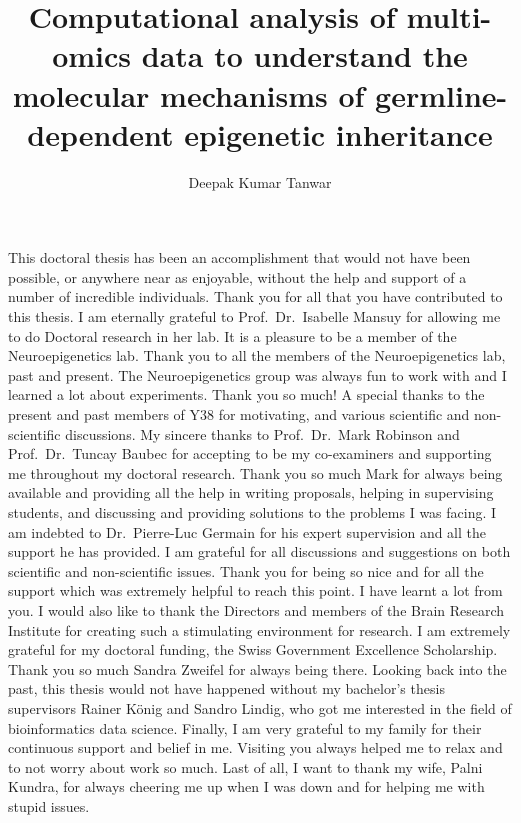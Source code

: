 \documentclass[12pt,twoside]{reedthesis}
\title{Computational analysis of multi-omics data to understand the molecular mechanisms of germline-dependent epigenetic inheritance}
\author{Deepak Kumar Tanwar}
\date{}
\begin{document}
  \maketitle

\frontmatter %
\pagestyle{empty} %
  \begin{acknowledgements}
    This doctoral thesis has been an accomplishment that would not have been possible, or anywhere near as enjoyable, without the help and support of a number of incredible individuals. Thank you for all that you have contributed to this thesis. \newline\newline I am eternally grateful to Prof.~Dr.~Isabelle Mansuy for allowing me to do Doctoral research in her lab. It is a pleasure to be a member of the Neuroepigenetics lab. Thank you to all the members of the Neuroepigenetics lab, past and present. The Neuroepigenetics group was always fun to work with and I learned a lot about experiments. Thank you so much! A special thanks to the present and past members of Y38 for motivating, and various scientific and non-scientific discussions. \newline\newline My sincere thanks to Prof.~Dr.~Mark Robinson and Prof.~Dr.~Tuncay Baubec for accepting to be my co-examiners and supporting me throughout my doctoral research. Thank you so much Mark for always being available and providing all the help in writing proposals, helping in supervising students, and discussing and providing solutions to the problems I was facing. \newline\newline I am indebted to Dr.~Pierre-Luc Germain for his expert supervision and all the support he has provided. I am grateful for all discussions and suggestions on both scientific and non-scientific issues. Thank you for being so nice and for all the support which was extremely helpful to reach this point. I have learnt a lot from you. \newline\newline I would also like to thank the Directors and members of the Brain Research Institute for creating such a stimulating environment for research. \newline\newline I am extremely grateful for my doctoral funding, the Swiss Government Excellence Scholarship. Thank you so much Sandra Zweifel for always being there. \newline\newline Looking back into the past, this thesis would not have happened without my bachelor's thesis supervisors Rainer König and Sandro Lindig, who got me interested in the field of bioinformatics data science. \newline\newline Finally, I am very grateful to my family for their continuous support and belief in me. Visiting you always helped me to relax and to not worry about work so much. Last of all, I want to thank my wife, Palni Kundra, for always cheering me up when I was down and for helping me with stupid issues.

\end{acknowledgements}
\end{document}
